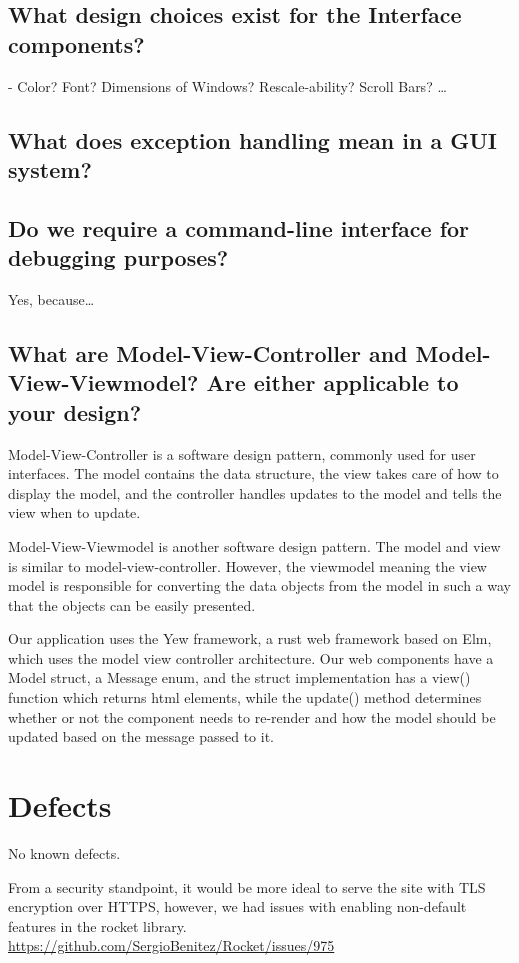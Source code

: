 \documentclass[letterpaper]{article}
\begin{document}
\subsection{What design choices exist for the Interface components?}
- Color? Font? Dimensions of Windows? Rescale-ability? Scroll Bars? \dots

\subsection{What does exception handling mean in a GUI system?}

\subsection{Do we require a command-line interface for debugging purposes?}
Yes, because\dots

\subsection{What are Model-View-Controller and Model-View-Viewmodel? Are either applicable to your
design?}
Model-View-Controller is a software design pattern, commonly used for user interfaces.
The model contains the data structure, the view takes care of how to display the model,
and the controller handles updates to the model and tells the view when to update.

Model-View-Viewmodel is another software design pattern. The model and view is similar to model-view-controller.
However, the viewmodel meaning the view model is responsible for converting the data objects from the model in such
a way that the objects can be easily presented.

Our application uses the Yew framework, a rust web framework based on Elm, which uses the model
view controller architecture. Our web components have a Model struct, a Message enum, and the
struct implementation has a view() function which returns html elements, while the update()
method determines whether or not the component needs to re-render and how the model should be updated
based on the message passed to it.

\section{Defects}
No known defects.

From a security standpoint, it would be more ideal to serve the site with TLS encryption over HTTPS,
however, we had issues with enabling non-default features in the rocket library.
\url{https://github.com/SergioBenitez/Rocket/issues/975}
\end{document}
